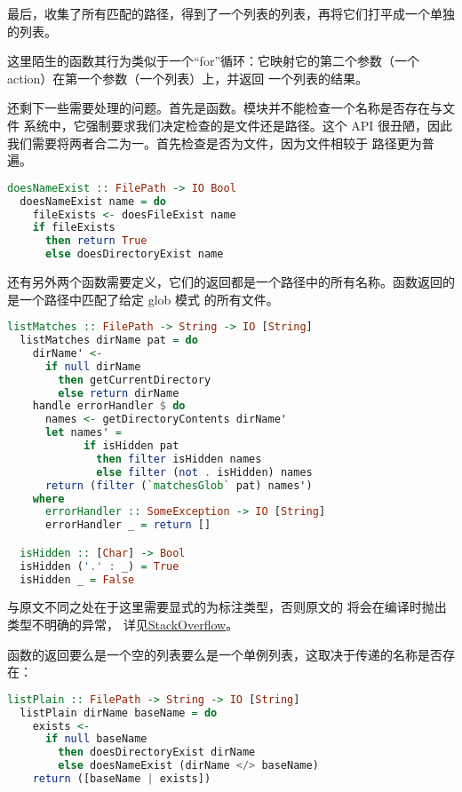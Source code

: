 \documentclass[./main.tex]{subfiles}
\begin{document}
最后，收集了所有匹配的路径，得到了一个列表的列表，再将它们打平成一个单独的列表。

这里陌生的函数其行为类似于一个“for”循环：它映射它的第二个参数（一个 action）在第一个参数（一个列表）上，并返回
一个列表的结果。

还剩下一些需要处理的问题。首先是函数。模块并不能检查一个名称是否存在与文件
系统中，它强制要求我们决定检查的是文件还是路径。这个 API 很丑陋，因此我们需要将两者合二为一。首先检查是否为文件，因为文件相较于
路径更为普遍。

\begin{lstlisting}[language=Haskell]
  doesNameExist :: FilePath -> IO Bool
  doesNameExist name = do
    fileExists <- doesFileExist name
    if fileExists
      then return True
      else doesDirectoryExist name
\end{lstlisting}

还有另外两个函数需要定义，它们的返回都是一个路径中的所有名称。函数返回的是一个路径中匹配了给定 glob 模式
的所有文件。

\begin{lstlisting}[language=Haskell]
  listMatches :: FilePath -> String -> IO [String]
  listMatches dirName pat = do
    dirName' <-
      if null dirName
        then getCurrentDirectory
        else return dirName
    handle errorHandler $ do
      names <- getDirectoryContents dirName'
      let names' =
            if isHidden pat
              then filter isHidden names
              else filter (not . isHidden) names
      return (filter (`matchesGlob` pat) names')
    where
      errorHandler :: SomeException -> IO [String]
      errorHandler _ = return []

  isHidden :: [Char] -> Bool
  isHidden ('.' : _) = True
  isHidden _ = False
\end{lstlisting}

与原文不同之处在于这里需要显式的为标注类型，否则原文的
将会在编译时抛出类型不明确的异常，
详见\href{https://stackoverflow.com/a/6009807/8163324}{StackOverflow}。

函数的返回要么是一个空的列表要么是一个单例列表，这取决于传递的名称是否存在：

\begin{lstlisting}[language=Haskell]
  listPlain :: FilePath -> String -> IO [String]
  listPlain dirName baseName = do
    exists <-
      if null baseName
        then doesDirectoryExist dirName
        else doesNameExist (dirName </> baseName)
    return ([baseName | exists])
\end{lstlisting}
\end{document}
